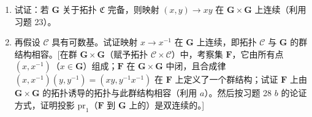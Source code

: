 \begin{enumerate}
\def\labelenumi{\alph{enumi})}
\item
  试证：若 \(\mathbf{G}\) 关于拓扑 \(\mathfrak{C}\) 完备，则映射 \((x,y)\to xy\) 在 \(\mathbf{G}\times\mathbf{G}\) 上连续（利用习题 23）。
\item
  再假设 \(\mathcal{C}\) 具有可数基。试证映射 \(x \to x^{-1}\) 在 \(\mathbf{G}\) 上连续，即拓扑 \(\mathcal{C}\) 与 \(\mathbf{G}\) 的群结构相容。{[}在群 \(\mathbf{G} \times \mathbf{G}\)（赋予拓扑 \(\mathcal{C} \times \mathcal{C}\)）中，考察集 \(\mathbf{F}\)，它由所有点 \((x, x^{-1})\)（\(x \in \mathbf{G}\)）组成；\(\mathbf{F}\) 在 \(\mathbf{G} \times \mathbf{G}\) 中闭，且合成律 \((x, x^{-1})(y, y^{-1}) = (xy, y^{-1}x^{-1})\) 在 \(\mathbf{F}\) 上定义了一个群结构；试证 \(\mathbf{F}\) 上由 \(\mathbf{G} \times \mathbf{G}\) 的拓扑诱导的拓扑与此群结构相容（利用 \(a\)）。然后按习题 28 \(b\) 的论证方式，证明投影 \(\mathrm{pr}_1\)（\(\mathbf{F}\) 到 \(\mathbf{G}\) 上的）是双连续的。{]}
\end{enumerate}

